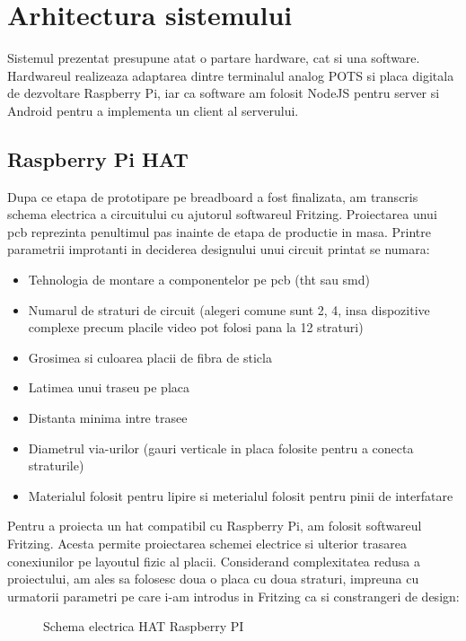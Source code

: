 \section {Arhitectura sistemului}

Sistemul prezentat presupune atat o partare hardware, cat si una software. Hardwareul realizeaza adaptarea dintre terminalul analog POTS si placa digitala de dezvoltare Raspberry Pi, iar ca software am folosit NodeJS pentru server si Android pentru a implementa un client al serverului.

\subsection {Raspberry Pi HAT}

Dupa ce etapa de prototipare pe breadboard a fost finalizata, am transcris schema electrica a circuitului cu ajutorul softwareul Fritzing. Proiectarea unui 
\acrfull{pcb} reprezinta penultimul pas inainte de etapa de productie in masa. Printre parametrii improtanti in deciderea designului unui circuit printat se numara:

\begin{itemize}
  \item Tehnologia de montare a componentelor pe \acrshort{pcb} (\acrfull{tht} sau \acrfull{smd})
  \item Numarul de straturi de circuit (alegeri comune sunt 2, 4, insa dispozitive complexe precum placile video pot folosi pana la 12 straturi)
  \item Grosimea si culoarea placii de fibra de sticla
  \item Latimea unui traseu pe placa
  \item Distanta minima intre trasee
  \item Diametrul via-urilor (gauri verticale in placa folosite pentru a conecta straturile)
  \item Materialul folosit pentru lipire si meterialul folosit pentru pinii de interfatare
\end{itemize}

Pentru a proiecta un \acrfull{hat} compatibil cu Raspberry Pi, am folosit softwareul Fritzing. Acesta permite proiectarea schemei electrice si ulterior trasarea conexiunilor pe layoutul fizic al placii. Considerand complexitatea redusa a proiectului, am ales sa folosesc doua o placa cu doua straturi, impreuna cu urmatorii parametri pe care i-am introdus in Fritzing ca si constrangeri de design:

\begin{figure}[h!]
  \centering
  \caption{Schema electrica HAT Raspberry PI}
\end{figure}

